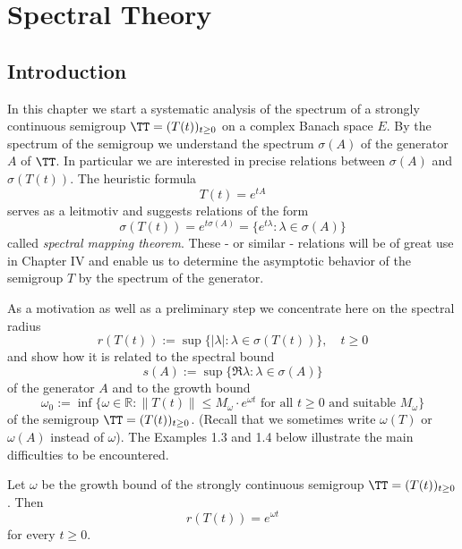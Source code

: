 \setcounter{chapter}{2}
\author{Günther Greiner and Rainer Nagel}
\chapter{Spectral Theory}\label{chap:A-III}

\section{Introduction}

In this chapter we start a systematic analysis of the spectrum of a strongly continuous semigroup $\TT = (T(t))_{t\geq 0}$ on a complex Banach space $E$.
By the spectrum of the semigroup we understand the spectrum $\sigma(A)$ of the generator $A$ of $\TT$.
In particular we are interested in precise relations between $\sigma(A)$ and $\sigma(T(t))$.
The heuristic formula
\[
	T(t) = e^{tA}
\]
serves as a leitmotiv and suggests relations of the form
\[
\sigma(T(t)) = e^{t\sigma(A)} = \{ e^{t\lambda} : \lambda \in \sigma(A) \}
\]
called \emph{spectral mapping theorem}.
These - or similar - relations will be of great use in Chapter IV and enable us to determine the asymptotic behavior of the semigroup $T$ by the spectrum of the generator.

As a motivation as well as a preliminary step we concentrate here on the spectral radius
\[
r(T(t)) := \sup \{ |\lambda| : \lambda \in \sigma(T(t)) \}, \quad t \geq 0
\]
and show how it is related to the spectral bound
\[
s(A) := \sup \{ \Re\lambda : \lambda \in \sigma(A) \}
\]
of the generator $A$ and to the growth bound
\[
\omega_{0} := \inf \{\omega \in \mathbb{R} : \|T(t)\| \leq M_{\omega}\cdot e^{\omega t} \text{ for all } t \geq 0 \text{ and suitable } M_{\omega}\}
\]
of the semigroup $\TT = (T(t))_{t\geq 0}$.
(Recall that we sometimes write $\omega(T)$ or $\omega(A)$ instead of $\omega$).
The Examples 1.3 and 1.4 below illustrate the main difficulties to be encountered.

\begin{proposition}\label{prop:1.1}
Let $\omega$ be the growth bound of the strongly continuous semigroup $\TT = (T(t))_{t\geq 0}$.
Then
\[
r(T(t)) = e^{\omega t}
\]
for every $t \geq 0$.
\end{proposition}

\newpage



